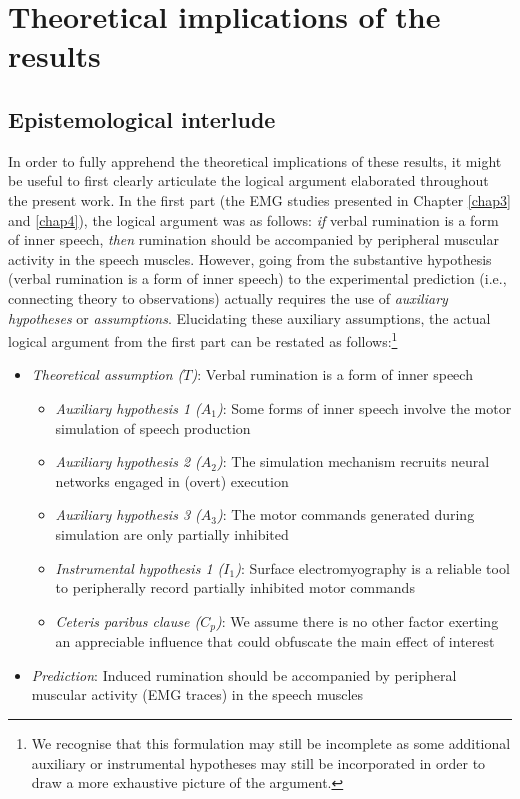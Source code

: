 \documentclass[a4paper,12pt,twoside,onecolumn,openright,final,oldfontcommands]{memoir}
\providecommand{\tightlist}{%
  \setlength{\itemsep}{0pt}\setlength{\parskip}{0pt}}
\let\rmarkdownfootnote\footnote%
\def\footnote{\protect\rmarkdownfootnote}
\begin{document}
\hypertarget{theoretical-implications-of-the-results}{%
\section{Theoretical implications of the results}\label{theoretical-implications-of-the-results}}

\hypertarget{epistemological-interlude}{%
\subsection{Epistemological interlude}\label{epistemological-interlude}}

In order to fully apprehend the theoretical implications of these results, it might be useful to first clearly articulate the logical argument elaborated throughout the present work. In the first part (the EMG studies presented in Chapter \ref{chap3} and \ref{chap4}), the logical argument was as follows: \emph{if} verbal rumination is a form of inner speech, \emph{then} rumination should be accompanied by peripheral muscular activity in the speech muscles. However, going from the substantive hypothesis (verbal rumination is a form of inner speech) to the experimental prediction (i.e., connecting theory to observations) actually requires the use of \emph{auxiliary hypotheses} or \emph{assumptions}. Elucidating these auxiliary assumptions, the actual logical argument from the first part can be restated as follows:\footnote{We recognise that this formulation may still be incomplete as some additional auxiliary or instrumental hypotheses may still be incorporated in order to draw a more exhaustive picture of the argument.}

\begin{itemize}
\item
  \emph{Theoretical assumption (\(T\))}: Verbal rumination is a form of inner speech

  \begin{itemize}
  \tightlist
  \item
    \emph{Auxiliary hypothesis 1 (\(A_{1}\))}: Some forms of inner speech involve the motor simulation of speech production
  \item
    \emph{Auxiliary hypothesis 2 (\(A_{2}\))}: The simulation mechanism recruits neural networks engaged in (overt) execution
  \item
    \emph{Auxiliary hypothesis 3 (\(A_{3}\))}: The motor commands generated during simulation are only partially inhibited
  \item
    \emph{Instrumental hypothesis 1 (\(I_{1}\))}: Surface electromyography is a reliable tool to peripherally record partially inhibited motor commands
  \item
    \emph{Ceteris paribus clause (\(C_{p}\))}: We assume there is no other factor exerting an appreciable influence that could obfuscate the main effect of interest
  \end{itemize}
\item
  \emph{Prediction}: Induced rumination should be accompanied by peripheral muscular activity (EMG traces) in the speech muscles
\end{itemize}
\end{document}
